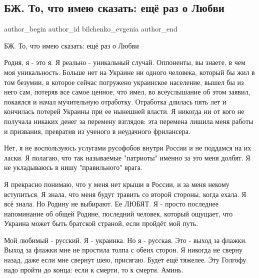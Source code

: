  
 
 
 
 
 
\subsection{БЖ. То, что имею сказать: ещё раз о Любви}
\label{sec:19_12_2021.fb.bilchenko_evgenia.1.ljubov}
 
\ifcmt
 author_begin
   author_id bilchenko_evgenia
 author_end
\fi


БЖ. То, что имею сказать: ещё раз о Любви

Родня, я - это я. Я реально - уникальный случай. Оппоненты, вы знаете, в чем
моя уникальность. Больше нет на Украине ни одного человека, который бы жил в
том безумии, в которое сейчас погружено украинское население, вышел бы из него
сам, потеряв все самое ценное, что имел, во всеуслышание об этом заявил,
покаялся и начал мучительную отработку. Отработка длилась пять лет и кончилась
потерей Украины при ее нынешней власти. Я никогда ни от кого не получала
никаких денег за перемену взглядов: эта перемена лишила меня работы и
призвания, превратив из ученого в неудачного фрилансера. 


Нет, я не воспользуюсь услугами русофобов внутри России и не поддамся на их
ласки. Я полагаю, что так называемые "патриоты" именно за это меня долбят. Я не
укладываюсь в нишу "правильного" врага.

Я прекрасно понимаю, что у меня нет крыши в России, и за меня некому
вступиться. Я знала, что меня будут травить со второй стороны, когда ехала. Я
всё знала. Но Родину не выбирают. Ее ЛЮБЯТ. Я - просто последнее напоминание об
общей Родине, последний человек, который ощущает, что Украина может быть
братской страной, если пройдёт мой путь.

Мой любимый - русский. Я - украинка. Но я - русская. Это - выход за флажки.
Выход за флажки мне не простила толпа с обеих сторон. Я никогда не сверну
назад, даже если мне свернут шею, присягаю. Будет ещё тяжелее.  Эту Голгофу
надо пройти до конца: если к смерти, то к смерти. Аминь.

